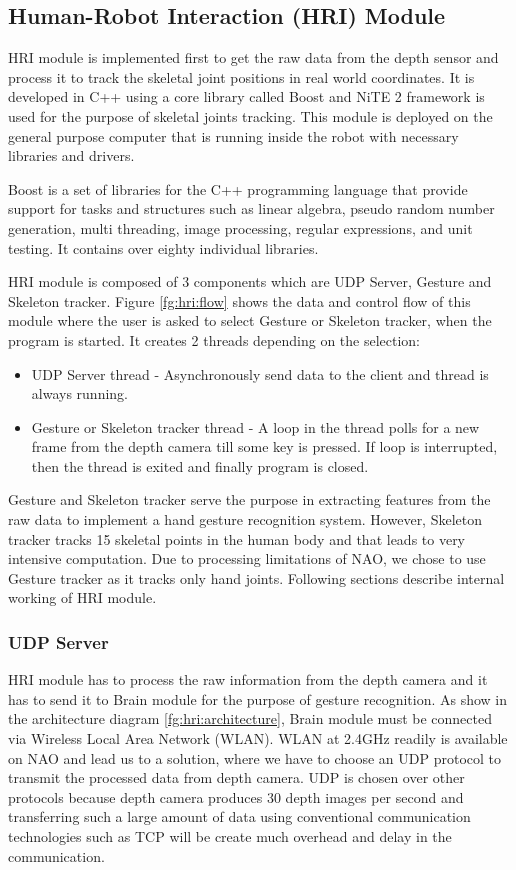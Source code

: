 \subsection{Human-Robot Interaction (HRI) Module} HRI module is implemented first to get the raw data from the depth sensor and process it to track the skeletal joint positions in real world coordinates. It is developed in C++ using a core library called Boost and NiTE 2 framework is used for the purpose of skeletal joints tracking. This module is deployed on the general purpose computer that is running inside the robot with necessary libraries and drivers.

Boost is a set of libraries for the C++ programming language that provide support for tasks and structures such as linear algebra, pseudo random number generation, multi threading, image processing, regular expressions, and unit testing. It contains over eighty individual libraries.

HRI module is composed of 3 components which are UDP Server, Gesture and Skeleton tracker. Figure \ref{fg:hri:flow} shows the data and control flow of this module where the user is asked to select Gesture or Skeleton tracker, when the program is started. It creates 2 threads depending on the selection: 
\begin{itemize}
	\item UDP Server thread - Asynchronously send data to the client and thread is always running. 
	\item Gesture or Skeleton tracker thread - A loop in the thread polls for a new frame from the depth camera till some key is pressed. If loop is interrupted, then the thread is exited and finally program is closed. 
\end{itemize}

Gesture and Skeleton tracker serve the purpose in extracting features from the raw data to implement a hand gesture recognition system. However, Skeleton tracker tracks 15 skeletal points in the human body and that leads to very intensive computation. Due to processing limitations of NAO, we chose to use Gesture tracker as it tracks only hand joints. Following sections describe internal working of HRI module.



\subsubsection{UDP Server} HRI module has to process the raw information from the depth camera and it has to send it to Brain module for the purpose of gesture recognition. As show in the architecture diagram \ref{fg:hri:architecture}, Brain module must be connected via Wireless Local Area Network (WLAN). WLAN at 2.4GHz readily is available on NAO and lead us to a solution, where we have to choose an UDP protocol to transmit the processed data from depth camera. UDP is chosen over other protocols because depth camera produces 30 depth images per second and transferring such a large amount of data using conventional communication technologies such as TCP will be create much overhead and delay in the communication.

